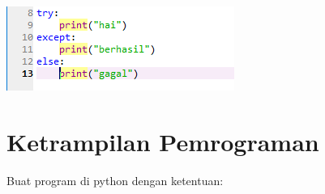 \begin{enumerate}
    \begin{center}
        \centering
        \includegraphics[scale=1.5]{figures/chapter 2/13.PNG}
    \end{center}

\end{enumerate}

\section{Ketrampilan Pemrograman}
Buat program di python dengan ketentuan:
